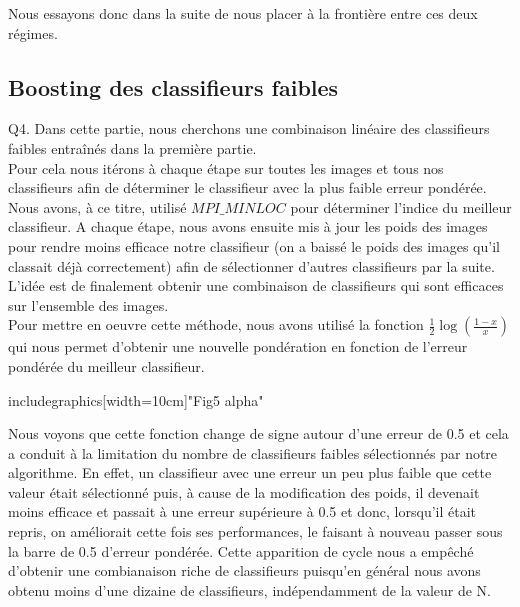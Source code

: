 \documentclass[a4paper,11pt]{article}
\begin{document}
Nous essayons donc dans la suite de nous placer à la frontière entre ces deux régimes.\\

\subsection{Boosting des classifieurs faibles}

Q4. Dans cette partie, nous cherchons une combinaison linéaire des classifieurs faibles entraînés dans la première partie.\\
Pour cela nous itérons à chaque étape sur toutes les images et tous nos classifieurs afin de déterminer le classifieur avec la plus faible erreur pondérée. Nous avons, à ce titre, utilisé $MPI\_MINLOC$ pour déterminer l’indice du meilleur classifieur. A chaque étape, nous avons ensuite mis à jour les poids des images pour rendre moins efficace notre classifieur (on a baissé le poids des images qu'il classait déjà correctement) afin de sélectionner d’autres classifieurs par la suite.\\
L’idée est de finalement obtenir une combinaison de classifieurs qui sont efficaces sur l’ensemble des images.\\

Pour mettre en oeuvre cette méthode, nous avons utilisé la fonction $\frac{1}{2}\log(\frac{1-x}{x})$ qui nous permet d'obtenir une nouvelle pondération en fonction de l’erreur pondérée du meilleur classifieur.\\

\begin{center}
includegraphics[width=10cm]{"Fig5 alpha"}\\
\end{center}

Nous voyons que cette fonction change de signe autour d’une erreur de 0.5 et cela a conduit à la limitation du nombre de classifieurs faibles sélectionnés par notre algorithme. En effet, un classifieur avec une erreur un peu plus faible que cette valeur était sélectionné puis, à cause de la modification des poids, il devenait moins efficace et passait à une erreur supérieure à 0.5 et donc, lorsqu’il était repris, on améliorait cette fois ses performances, le faisant à nouveau passer sous la barre de 0.5 d’erreur pondérée. Cette apparition de cycle nous a empêché d’obtenir une combianaison riche de classifieurs puisqu’en général nous avons obtenu moins d’une dizaine de classifieurs, indépendamment de la valeur de N.\\
\end{document}
